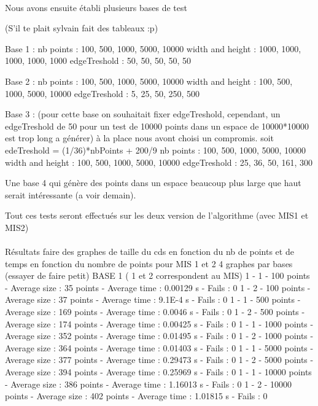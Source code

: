 \paragraph{}
Nous avons ensuite établi plusieurs bases de test

(S'il te plait sylvain fait des tableaux :p)

Base 1 :
nb points : 100, 500, 1000, 5000, 10000
width and height : 1000, 1000, 1000, 1000, 1000
edgeTreshold : 50, 50, 50, 50, 50

Base 2 :
nb points : 100, 500, 1000, 5000, 10000
width and height : 100, 500, 1000, 5000, 10000
edgeTreshold : 5, 25, 50, 250, 500

Base 3 : (pour cette base on souhaitait fixer edgeTreshold, cependant, un edgeTreshold de 50 pour un test de 10000 points dans un espace de 10000*10000 est trop long a générer) à la place nous avont choisi un compromis.
soit edeTreshold = (1/36)*nbPoints + 200/9
nb points : 100, 500, 1000, 5000, 10000
width and height : 100, 500, 1000, 5000, 10000
edgeTreshold : 25, 36, 50, 161, 300

Une base 4 qui génère des points dans un espace beaucoup plus large que haut serait intéressante (a voir demain).

Tout ces tests seront effectués sur les deux version de l'algorithme (avec MIS1 et MIS2)

\paragraph{}

Résultats faire des graphes de taille du cds en fonction du nb de points et de temps en fonction du nombre de points pour MIS 1 et 2
4 graphes par bases (essayer de faire petit)
BASE 1 ( 1 et 2 correspondent au MIS)
1 - 1 - 100 points - Average size : 35 points - Average time : 0.00129 s - Fails : 0
1 - 2 - 100 points - Average size : 37 points - Average time : 9.1E-4 s - Fails : 0
1 - 1 - 500 points - Average size : 169 points - Average time : 0.0046 s - Fails : 0
1 - 2 - 500 points - Average size : 174 points - Average time : 0.00425 s - Fails : 0
1 - 1 - 1000 points - Average size : 352 points - Average time : 0.01495 s - Fails : 0
1 - 2 - 1000 points - Average size : 364 points - Average time : 0.01403 s - Fails : 0
1 - 1 - 5000 points - Average size : 377 points - Average time : 0.29473 s - Fails : 0
1 - 2 - 5000 points - Average size : 394 points - Average time : 0.25969 s - Fails : 0
1 - 1 - 10000 points - Average size : 386 points - Average time : 1.16013 s - Fails : 0
1 - 2 - 10000 points - Average size : 402 points - Average time : 1.01815 s - Fails : 0

